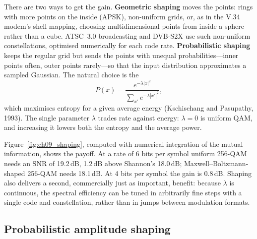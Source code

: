 There are two ways to get the gain. \textbf{Geometric shaping} moves the
points: rings with more points on the inside (APSK), non-uniform grids, or, as in the V.34 modem's
shell mapping, choosing multidimensional points from inside a sphere rather than a cube. ATSC~3.0
broadcasting and DVB-S2X use such non-uniform constellations, optimised numerically for each code
rate. \textbf{Probabilistic shaping} keeps the regular grid but sends
the points with unequal probabilities---inner points often, outer points rarely---so that the input
distribution approximates a sampled Gaussian. The natural choice is the
\begin{equation}
P(x)=\frac{e^{-\lambda|x|^2}}{\sum_{x'}e^{-\lambda|x'|^2}},
\label{eq:ch09:mb}
\end{equation}
which maximises entropy for a given average energy (Kschischang and Pasupathy, 1993). The single
parameter $\lambda$ trades rate against energy: $\lambda=0$ is uniform QAM, and increasing it lowers
both the entropy and the average power.


Figure~\ref{fig:ch09_shaping}, computed with numerical integration of the mutual information, shows
the payoff. At a rate of 6 bits per symbol uniform 256-QAM needs an SNR of 19.2\,dB, 1.2\,dB above
Shannon's 18.0\,dB; Maxwell--Boltzmann-shaped 256-QAM needs 18.1\,dB. At 4 bits per symbol the
gain is 0.8\,dB. Shaping also delivers a second, commercially just as important, benefit: because
$\lambda$ is continuous, the spectral efficiency can be tuned in arbitrarily fine steps with a single
code and constellation, rather than in jumps between modulation formats.

\subsection{Probabilistic amplitude shaping}

